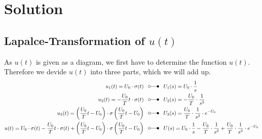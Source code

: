 \documentclass[a4paper]{article}
\begin{document}
\newpage
\section{Solution}
\subsection{Lapalce-Transformation of $u(t)$}
As $u(t)$ is given as a diagram, we first have to determine the function $u(t)$. Therefore we devide $u(t)$ into three parts, which we will add up.
\begin{align*}
	u_1(t) = U_0 \cdot \sigma(t) \;\;\; &\laplace \;\;\; U_1(s) = U_0 \cdot \frac{1}{s}\\
	u_2(t) = -\frac{U_0}{T}t \cdot \sigma(t) \;\;\; &\laplace \;\;\; U_2(s) = -\frac{U_0}{T} \cdot \frac{1}{s^2}\\
	u_3(t) = \left(\frac{U_0}{T}t-U_0 \right) \cdot \sigma\left(\frac{U_0}{T}t-U_0 \right) \;\;\; &\laplace \;\;\; 
	U_3(s) = \frac{U_0}{T} \cdot \frac{1}{s^2} \cdot e^{-U_0}\\
	u(t) = U_0 \cdot \sigma(t) - \frac{U_0}{T}t \cdot \sigma(t) + \left(\frac{U_0}{T}t-U_0 \right) \cdot \sigma\left(\frac{U_0}{T}t-U_0 \right) \;\;\; &\laplace \;\;\;
	U(s) = U_0 \cdot \frac{1}{s} - \frac{U_0}{T} \cdot \frac{1}{s^2} + \frac{U_0}{T} \cdot \frac{1}{s^2} \cdot e^{-U_0}\\
\end{align*}
\end{document}
